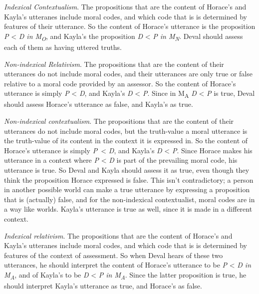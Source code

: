 \begin{itemize*}
\item \textit{Indexical Contextualism}. The propositions that are the content of Horace's and Kayla's utteranes include moral codes, and which code that is is determined by features of their utterance. So the content of Horace's utterance is the proposition \textit{P }{\textless}\textit{ D in M}\textit{\textsubscript{O}}, and Kayla's the proposition \textit{D }{\textless}\textit{ P in M}\textit{\textsubscript{N}}. Deval should assess each of them as having uttered truths.
\item \textit{Non-indexical Relativism}. The propositions that are the content of their utterances do not include moral codes, and their utterances are only true or false relative to a moral code provided by an assessor. So the content of Horace's utterance is simply \textit{P }{\textless}\textit{ D}, and Kayla's \textit{D }{\textless}\textit{ P}. Since in M\textsubscript{A} \textit{D }{\textless}\textit{ P} is true, Deval should assess Horace's utterance as false, and Kayla's as true.
\item \textit{Non-indexical contextualism}. The propositions that are the content of their utterances do not include moral codes, but the truth-value a moral utterance is the truth-value of its content in the context it is expressed in. So the content of Horace's utterance is simply \textit{P~}{\textless}\textit{ D}, and Kayla's \textit{D }{\textless}\textit{ P}. Since Horace makes his utterance in a context where \textit{P} {\textless} \textit{D} is part of the prevailing moral code, his utterance is true. So Deval and Kayla should assess it as true, even though they think the proposition Horace expressed is false. This isn't contradictory; a person in another possible world can make a true utterance by expressing a proposition that is (actually) false, and for the non-indexical contextualist, moral codes are in a way like worlds. Kayla's utterance is true as well, since it is made in a different context.
\item \textit{Indexical relativism}. The propositions that are the content of Horace's and Kayla's utteranes include moral codes, and which code that is is determined by features of the context of assessment. So when Deval hears of these two utterances, he should interpret the content of Horace's utterance to be \textit{P }{\textless}\textit{ D in M}\textit{\textsubscript{A}}, and of Kayla's to be \textit{D }{\textless}\textit{ P in M}\textit{\textsubscript{A}}. Since the latter proposition is true, he should interpret Kayla's utterance as true, and Horace's as false.
\end{itemize*}

